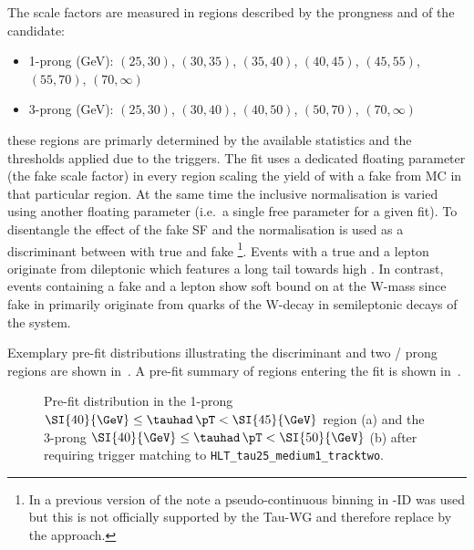 The scale factors are measured in regions described by the prongness and \pT of
the \tauhad candidate:
\begin{itemize}
\item 1-prong \tauhad \pT (GeV): $(25, 30)$, $(30, 35)$, $(35, 40)$, $(40, 45)$, $(45, 55)$, $(55,
    70)$, $(70, \infty)$
\item 3-prong \tauhad \pT (GeV): $(25, 30)$, $(30, 40)$, $(40, 50)$, $(50, 70)$,
  $(70, \infty)$
\end{itemize}
these regions are primarly determined by the available statistics and
the \tauhad \pT thresholds applied due to the \tauhad triggers. The
fit uses a dedicated floating parameter (the fake scale factor) in
every region scaling the yield of \ttbar with a fake \tauhad from MC
in that particular region. At the same time the inclusive \ttbar
normalisation is varied using another floating parameter (i.e.\ a
single free parameter for a given fit). To disentangle the effect of
the fake \tauhad SF and the \ttbar normalisation \mtw is used as a
discriminant between \ttbar with true and fake \tauhad\footnote{In a
  previous version of the note a pseudo-continuous binning in
  \tauhad-ID was used but this is not officially supported by the
  Tau-WG and therefore replace by the \mtw approach.}. Events with a
true \tauhad and a lepton originate from dileptonic \ttbar which
features a long tail towards high \mtw. In contrast, events containing
a fake \tauhad and a lepton show soft bound on \mtw at the W-mass
since fake \tauhad in \ttbar primarily originate from quarks of the
W-decay in semileptonic decays of the \ttbar system.

Exemplary pre-fit distributions illustrating the discriminant and two
\tauhad \pT / prong regions are shown
in~. A pre-fit summary of regions
entering the fit is shown in~.

\begin{figure}[htb]
  \centering
  \caption{Pre-fit distribution in the 1-prong $\SI{40}{\GeV} \leq \tauhad \,
    \pT < \SI{45}{\GeV}$ region (a) and the 3-prong $\SI{40}{\GeV} \leq \tauhad
    \, \pT < \SI{50}{\GeV}$ (b) after requiring trigger matching to
    \texttt{HLT\_tau25\_medium1\_tracktwo}.}
  \label{fig:ttbarfake_hadhad_prefit}
\end{figure}


